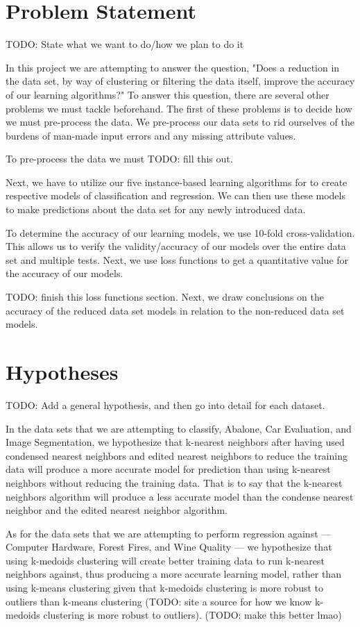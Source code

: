\documentclass[twoside,11pt]{article}
\begin{document}
\section{Problem Statement}
TODO: State what we want to do/how we plan to do it

In this project we are attempting to answer the question, "Does a reduction in the data set, by way of clustering or filtering the data itself, improve the accuracy of our learning algorithms?" To answer this question, there are several other problems we must tackle beforehand. The first of these problems is to decide how we must pre-process the data. We pre-process our data sets to rid ourselves of the burdens of man-made input errors and any missing attribute values.

To pre-process the data we must TODO: fill this out.

Next, we have to utilize our five instance-based learning algorithms for to create respective models of classification and regression. We can then use these models to make predictions about the data set for any newly introduced data.

To determine the accuracy of our learning models, we use 10-fold cross-validation. This allows us to verify the validity/accuracy of our models over the entire data set and multiple tests. Next, we use loss functions to get a quantitative value for the accuracy of our models.

TODO: finish this loss functions section. Next, we draw conclusions on the accuracy of the reduced data set models in relation to the non-reduced data set models.

\section{Hypotheses}

TODO: Add a general hypothesis, and then go into detail for each dataset.

In the data sets that we are attempting to classify, Abalone, Car Evaluation, and Image Segmentation, we hypothesize that k-nearest neighbors after having used condensed nearest neighbors and edited nearest neighbors to reduce the training data will produce a more accurate model for prediction than using k-nearest neighbors without reducing the training data. That is to say that the k-nearest neighbors algorithm will produce a less accurate model than the condense nearest neighbor and the edited nearest neighbor algorithm.

As for the data sets that we are attempting to perform regression against --- Computer Hardware, Forest Fires, and Wine Quality --- we hypothesize that using k-medoids clustering will create better training data to run k-nearest neighbors against, thus producing a more accurate learning model, rather than using k-means clustering given that k-medoids clustering is more robust to outliers than k-means clustering (TODO: site a source for how we know k-medoids clustering is more robust to outliers). (TODO: make this better lmao)
\end{document}
